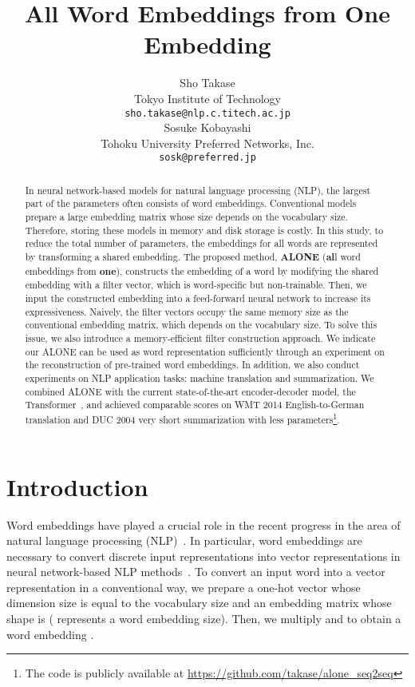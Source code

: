 \documentclass{article}
\title{All Word Embeddings from One Embedding}
\author{Sho Takase \\
  Tokyo Institute of Technology \\
  \texttt{sho.takase@nlp.c.titech.ac.jp} \\
\And
  Sosuke Kobayashi \\
  Tohoku University \hspace{4mm} Preferred Networks, Inc. \\
  \texttt{sosk@preferred.jp} \\
}
\begin{document}
\maketitle

\begin{abstract}
In neural network-based models for natural language processing (NLP), the largest part of the parameters often consists of word embeddings.
Conventional models prepare a large embedding matrix whose size depends on the vocabulary size.
Therefore, storing these models in memory and disk storage is costly.
In this study, to reduce the total number of parameters, the embeddings for all words are represented by transforming a shared embedding.
The proposed method, \textbf{ALONE} (\textbf{al}l word embeddings from \textbf{one}), constructs the embedding of a word by modifying the shared embedding with a filter vector, which is word-specific but non-trainable.
Then, we input the constructed embedding into a feed-forward neural network to increase its expressiveness.
Naively, the filter vectors occupy the same memory size as the conventional embedding matrix, which depends on the vocabulary size.
To solve this issue, we also introduce a memory-efficient filter construction approach.
We indicate our ALONE can be used as word representation sufficiently through an experiment on the reconstruction of pre-trained word embeddings.
In addition, we also conduct experiments on NLP application tasks: machine translation and summarization.
We combined ALONE with the current state-of-the-art encoder-decoder model, the Transformer~\cite{NIPS2017_7181}, and achieved comparable scores on WMT 2014 English-to-German translation and DUC 2004 very short summarization with less parameters\footnote{The code is publicly available at \href{https://github.com/takase/alone_seq2seq}{https://github.com/takase/alone\_seq2seq}}.
\end{abstract}

\section{Introduction}
Word embeddings have played a crucial role in the recent progress in the area of natural language processing (NLP)~\cite{Collobert:2011:NLP:2078183.2078186,NIPS2013_5021,pennington2014glove,peters-etal-2018-deep}.
In particular, word embeddings are necessary to convert discrete input representations into vector representations in neural network-based NLP methods~\cite{Collobert:2011:NLP:2078183.2078186}.
To convert an input word  into a vector representation in a conventional way, we prepare a one-hot vector  whose dimension size is equal to the vocabulary size  and an embedding matrix  whose shape is  ( represents a word embedding size).
Then, we multiply  and  to obtain a word embedding .
\end{document}

